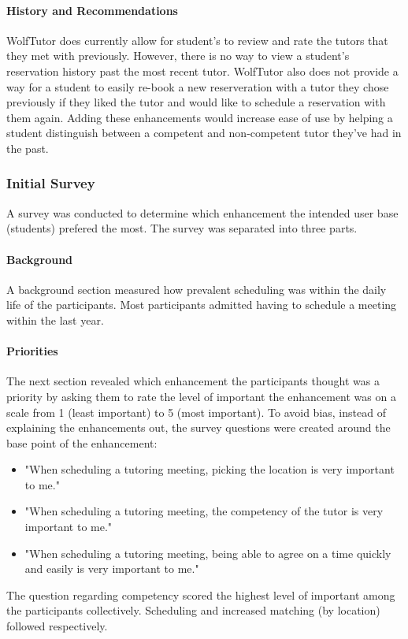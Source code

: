 \paragraph{History and Recommendations} WolfTutor does currently allow
for student's to review and rate the tutors that they met with
previously. However, there is no way to view a student's reservation
history past the most recent tutor. WolfTutor also does not provide a
way for a student to easily re-book a new reserveration with a tutor
they chose previously if they liked the tutor and would like to
schedule a reservation with them again. Adding these enhancements
would increase ease of use by helping a student distinguish between a
competent and non-competent tutor they've had in the past.


\subsubsection{Initial Survey}
\label{sec:initial-survey} A survey was conducted to determine which
enhancement the intended user base (students) prefered the most. The
survey was separated into three parts.

\paragraph{Background} A background section measured how prevalent
scheduling was within the daily life of the participants. Most
participants admitted having to schedule a meeting within the last
year.

\paragraph{Priorities} The next section revealed which enhancement the
participants thought was a priority by asking them to rate the level
of important the enhancement was on a scale from 1 (least important)
to 5 (most important). To avoid bias, instead of explaining the
enhancements out, the survey questions were created around the base
point of the enhancement:
\begin{itemize}
  \item "When scheduling a tutoring meeting, picking the location is
very important to me."
  \item "When scheduling a tutoring meeting, the competency of the
tutor is very important to me."
  \item "When scheduling a tutoring meeting, being able to agree on a
time quickly and easily is very important to me."
\end{itemize} The question regarding competency scored the highest
level of important among the participants collectively. Scheduling and
increased matching (by location) followed respectively.

